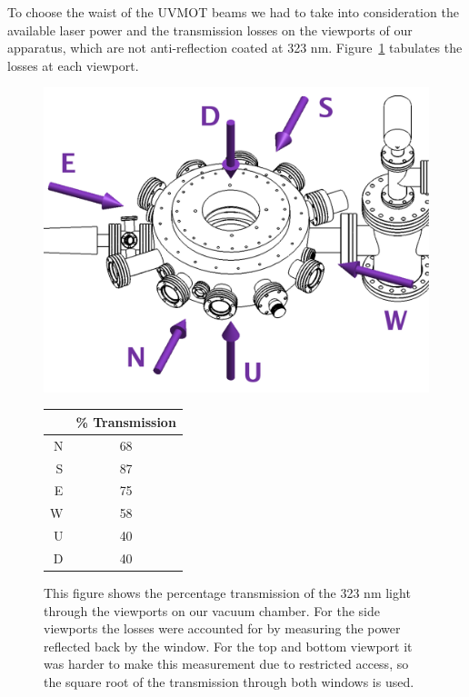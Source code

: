To choose the waist of  the UVMOT beams we had to take into consideration the
available laser power and the transmission losses on the viewports of our
apparatus, which are not anti-reflection coated at
323 nm.  Figure~\ref{fig:012} tabulates the losses at each viewport.
\begin{figure} \begin{minipage}{0.5\linewidth}
\includegraphics[width=\textwidth]{../masters-figures/323setup/losses/losses.pdf}
\end{minipage} \begin{minipage}{0.5\linewidth} \centering \begin{tabular}{r|c}
& \% Transmission  \\ \hline N & 68 \\ S & 87 \\ E & 75 \\ W & 58 \\ U & 40 \\
D & 40 \\ \end{tabular} \end{minipage} \caption[UVMOT Losses on windows]{\small
This figure shows the percentage transmission of the 323 nm light through the
viewports on our vacuum chamber.  For the side viewports the losses were
accounted for by measuring the power reflected back by the window.  For the top
and bottom viewport it was harder to make this measurement due to restricted
access, so the square root of the transmission through both windows is used. }
\label{fig:012} \end{figure} 
